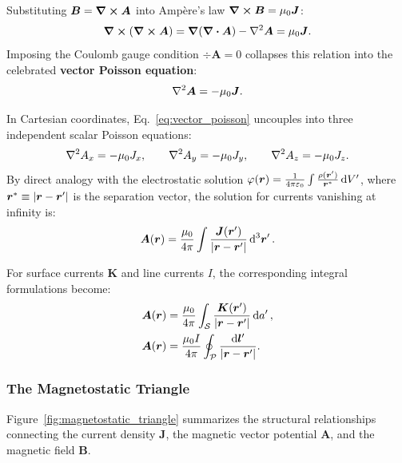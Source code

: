 Substituting $\bm{B} = \curl \bm{A}$ into Ampère's law $\curl \bm{B} = \mu_0 \bm{J}$:
\begin{equation}
    \curl(\curl \bm{A}) = \grad(\div \bm{A}) - \laplacian \bm{A} = \mu_0 \bm{J}.
\end{equation}
Imposing the Coulomb gauge condition $\div \bm{A} = 0$ collapses this relation into the celebrated \textbf{vector Poisson equation}:
\begin{equation}
    \laplacian \bm{A} = -\mu_0 \bm{J}.
    \label{eq:vector_poisson}
\end{equation}

In Cartesian coordinates, Eq.~\eqref{eq:vector_poisson} uncouples into three independent scalar Poisson equations:
\begin{equation}
    \laplacian A_x = -\mu_0 J_x, \qquad \laplacian A_y = -\mu_0 J_y, \qquad \laplacian A_z = -\mu_0 J_z.
\end{equation}
By direct analogy with the electrostatic solution $\varphi(\bm{r}) = \frac{1}{4\pi\varepsilon_0}\int \frac{\rho(\bm{r}')}{\bm{r}^*} \dd{V'}$, where $\bm{r}^* \equiv |\bm{r} - \bm{r}'|$ is the separation vector, the solution for currents vanishing at infinity is:
\begin{equation}
    \bm{A}(\bm{r}) = \frac{\mu_0}{4\pi} \int \frac{\bm{J}(\bm{r}')}{|\bm{r} - \bm{r}'|} \dd[3]{\bm{r}'}.
\end{equation}

For surface currents $\bm{K}$ and line currents $I$, the corresponding integral formulations become:
\begin{align}
    \bm{A}(\bm{r}) &= \frac{\mu_0}{4\pi} \int_{\mathcal{S}} \frac{\bm{K}(\bm{r}')}{|\bm{r} - \bm{r}'|} \dd{a'}, \label{eq:A_surface} \\
    \bm{A}(\bm{r}) &= \frac{\mu_0 I}{4\pi} \oint_{\mathcal{P}} \frac{\dd{\bm{l}'}}{|\bm{r} - \bm{r}'|}. \label{eq:A_line}
\end{align}

\subsubsection{The Magnetostatic Triangle}

Figure~\ref{fig:magnetostatic_triangle} summarizes the structural relationships connecting the current density $\bm{J}$, the magnetic vector potential $\bm{A}$, and the magnetic field $\bm{B}$.

